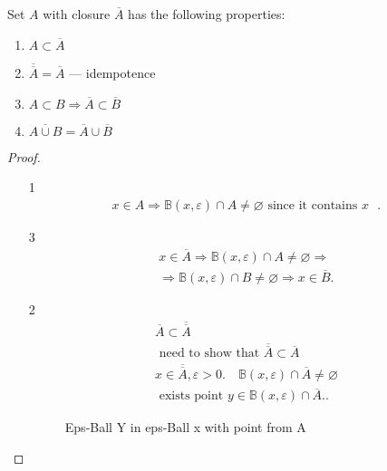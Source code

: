 \begin{theorem}
    Set $A$ with closure $\overline{A}$ has the following properties:
    \begin{enumerate}
        \item $A \subset \overline{A}$
        \item $\overline{\overline{A}} = \overline{A}$ --- idempotence
        \item $A \subset B \Rightarrow \overline{A} \subset \overline{B}$
        \item $\overline{A \cup B} = \overline{A} \cup \overline{B}$
    \end{enumerate}
\end{theorem}
\begin{proof}
    \begin{itemize}
        \item[1] \begin{align*}
        x \in A \Rightarrow \mathbb{B}(x, \varepsilon) \cap A \not= \varnothing \text{ since it contains $x$ }
        .\end{align*}
    \item[3] \begin{align*}
        x \in \overline{A} \Rightarrow \mathbb{B}(x, \varepsilon) \cap A \not= \varnothing \Rightarrow \\
        \Rightarrow \mathbb{B}(x, \varepsilon) \cap B \not= \varnothing \Rightarrow 
        x \in \overline{B}
        .\end{align*}
        \item[2] \begin{align*}
            \overline{A} \subset \overline{\overline{A}} \\
            \text{ need to show that } \overline{\overline{A}} \subset \overline{A} \\
            x \in \overline{\overline{A}}, \varepsilon > 0. \quad
            \mathbb{B}(x, \varepsilon) \cap \overline{A} \not= \varnothing \\
            \text{ exists point } y \in \mathbb{B}(x, \varepsilon) \cap \overline{A}.
        .\end{align*}
        \begin{figure}[ht]
            \centering
            \caption{Eps-Ball Y in eps-Ball x with point from A}
            \label{fig:eps-ball-y-in-eps-ball-x-with-point-from-a}
        \end{figure}


\end{itemize}
\end{proof}
